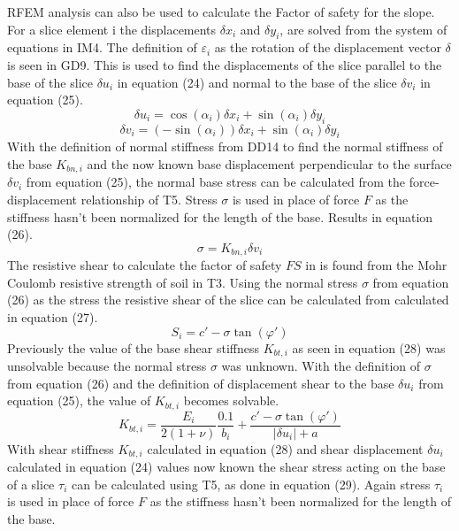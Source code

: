 \documentclass[12pt]{article}
\begin{document}
RFEM analysis can also be used to calculate the Factor of safety for the slope. For a slice element i the displacements $\delta{}x_{i}$ and $\delta{}y_{i}$, are solved from the system of equations in IM4. The definition of $\varepsilon{}_{i}$ as the rotation of the displacement vector $\delta{}$ is seen in GD9. This is used to find the displacements of the slice parallel to the base of the slice $\delta{}u_{i}$ in equation (24) and normal to the base of the slice $\delta{}v_{i}$ in equation (25).
\begin{equation}
\delta{}u_{i}=\cos\left(\alpha{}_{i}\right)\delta{}x_{i}+\sin\left(\alpha{}_{i}\right)\delta{}y_{i}
\end{equation}
\begin{equation}
\delta{}v_{i}=\left(-\sin\left(\alpha{}_{i}\right)\right)\delta{}x_{i}+\sin\left(\alpha{}_{i}\right)\delta{}y_{i}
\end{equation}
With the definition of normal stiffness from DD14 to find the normal stiffness of the base $K_{bn,i}$ and the now known base displacement perpendicular to the surface $\delta{}v_{i}$ from equation (25), the normal base stress can be calculated from the force-displacement relationship of T5. Stress $\sigma{}$ is used in place of force $F$ as the stiffness hasn't been normalized for the length of the base. Results in equation (26).
\begin{equation}
\sigma{}=K_{bn,i}\delta{}v_{i}
\end{equation}
The resistive shear to calculate the factor of safety $FS$ in is found from the Mohr Coulomb resistive strength of soil in T3. Using the normal stress $\sigma{}$ from equation (26) as the stress the resistive shear of the slice can be calculated from calculated in equation (27).
\begin{equation}
S_{i}=c'-\sigma{}\tan\left(\varphi{}'\right)
\end{equation}
Previously the value of the base shear stiffness $K_{bt,i}$ as seen in equation (28) was unsolvable because the normal stress $\sigma{}$ was unknown. With the definition of $\sigma{}$ from equation (26) and the definition of displacement shear to the base $\delta{}u_{i}$ from equation (25), the value of $K_{bt,i}$ becomes solvable.
\begin{equation}
K_{bt,i}=\frac{E_{i}}{2\left(1+\nu{}\right)}\frac{0.1}{b_{i}}+\frac{c'-\sigma{}\tan\left(\varphi{}'\right)}{|\delta{}u_{i}|+a}
\end{equation}
With shear stiffness $K_{bt,i}$ calculated in equation (28) and shear displacement $\delta{}u_{i}$ calculated in equation (24) values now known the shear stress acting on the base of a slice $\tau{}_{i}$ can be calculated using T5, as done in equation (29). Again stress $\tau{}_{i}$ is used in place of force $F$ as the stiffness hasn't been normalized for the length of the base.
\end{document}

